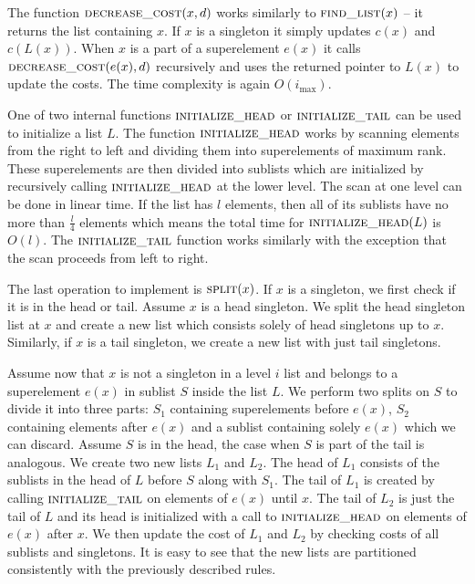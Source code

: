 The function $\textsc{decrease\_cost}(x, d)$ works similarly to $\textsc{find\_list}(x)$ – it returns the list containing $x$. If $x$ is a singleton it simply updates $c(x)$ and $c(L(x))$. When $x$ is a part of a superelement $e(x)$ it calls $\textsc{decrease\_cost}(e(x), d)$ recursively and uses the returned pointer to $L(x)$ to update the costs. The time complexity is again $O(i_{\max})$.

One of two internal functions $\textsc{initialize\_head}$ or $\textsc{initialize\_tail}$ can be used to initialize a list $L$. The function $\textsc{initialize\_head}$ works by scanning elements from the right to left and dividing them into superelements of maximum rank. These superelements are then divided into sublists which are initialized by recursively calling $\textsc{initialize\_head}$ at the lower level. The scan at one level can be done in linear time. If the list has $l$ elements, then all of its sublists have no more than $\frac{l}{4}$ elements which means the total time for $\textsc{initialize\_head}(L)$ is $O(l)$. The $\textsc{initialize\_tail}$ function works similarly with the exception that the scan proceeds from left to right.

The last operation to implement is $\textsc{split}(x)$. If $x$ is a singleton, we first check if it is in the head or tail. Assume $x$ is a head singleton. We split the head singleton list at $x$ and create a new list which consists solely of head singletons up to $x$. Similarly, if $x$ is a tail singleton, we create a new list with just tail singletons.

Assume now that $x$ is not a singleton in a level $i$ list and belongs to a superelement $e(x)$ in sublist $S$ inside the list $L$. We perform two splits on $S$ to divide it into three parts: $S_1$ containing superelements before $e(x)$, $S_2$ containing elements after $e(x)$ and a sublist containing solely $e(x)$ which we can discard. Assume $S$ is in the head, the case when $S$ is part of the tail is analogous. We create two new lists $L_1$ and $L_2$. The head of $L_1$ consists of the sublists in the head of $L$ before $S$ along with $S_1$. The tail of $L_1$ is created by calling $\textsc{initialize\_tail}$ on elements of $e(x)$ until $x$. The tail of $L_2$ is just the tail of $L$ and its head is initialized with a call to $\textsc{initialize\_head}$ on elements of $e(x)$ after $x$. We then update the cost of $L_1$ and $L_2$ by checking costs of all sublists and singletons. It is easy to see that the new lists are partitioned consistently with the previously described rules.

